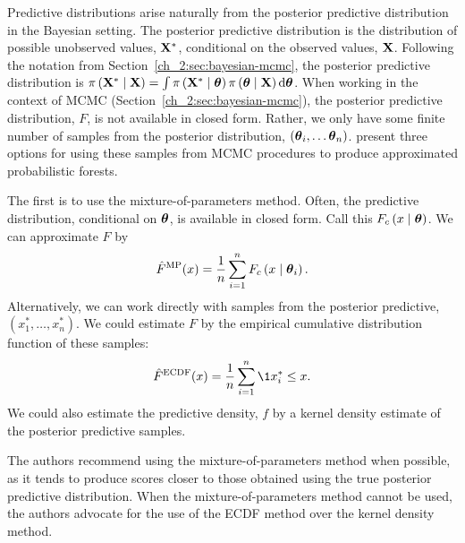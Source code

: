 Predictive distributions arise naturally from the posterior predictive distribution in the Bayesian setting.
The posterior predictive distribution is the distribution of possible unobserved values, \( \mathbf{X}^* \), conditional on the observed values, \( \mathbf{X} \).
Following the notation from Section~\ref{ch_2:sec:bayesian-mcmc}, the posterior predictive distribution is \( \pi \left( \mathbf{X}^* \mid \mathbf{X} \right) = \int \pi \left( \mathbf{X}^* \mid \boldsymbol{\theta} \right) \pi \left( \boldsymbol{\theta} \mid \mathbf{X} \right) \mathrm{d} \boldsymbol{\theta} \).
When working in the context of MCMC (Section~\ref{ch_2:sec:bayesian-mcmc}), the posterior predictive distribution, \( F \), is not available in closed form.
Rather, we only have some finite number of samples from the posterior distribution, \( \left( \boldsymbol{\theta}_i, \ldots \boldsymbol{\theta}_n \right) \).
\citet{kruger2021predictive} present three options for using these samples from MCMC procedures to produce approximated probabilistic forests.

The first is to use the mixture-of-parameters method.
Often, the predictive distribution, conditional on \( \boldsymbol{\theta} \), is available in closed form.
Call this \( F_c \left( x \mid \boldsymbol{\theta} \right) \).
We can approximate \( F \) by 
\begin{equation}
    \hat{F}^\mathrm{MP}(x) = \frac{1}{n} \sum_{i=1}^n F_c \left( x \mid \boldsymbol{\theta}_i \right).
\end{equation}
Alternatively, we can work directly with samples from the posterior predictive, \( \left( x^*_1, \ldots, x^*_n \right) \).
We could estimate \( F \) by the empirical cumulative distribution function of these samples:
\begin{equation}
    \hat{F}^\mathrm{ECDF}(x) = \frac{1}{n} \sum_{i=1}^n \1{x^*_i \leq x}.
\end{equation}
We could also estimate the predictive density, \( f \) by a kernel density estimate of the posterior predictive samples.

The authors recommend using the mixture-of-parameters method when possible, as it tends to produce scores closer to those obtained using the true posterior predictive distribution.
When the mixture-of-parameters method cannot be used, the authors advocate for the use of the ECDF method over the kernel density method.

